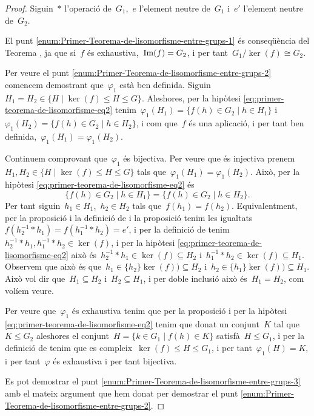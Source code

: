 \documentclass[../../main.tex]{subfiles}
\begin{document}
    \begin{proof}
        Siguin~\(\ast\) l'operació de~\(G_{1}\),~\(e\) l'element neutre de~\(G_{1}\) i~\(e'\) l'element neutre de~\(G_{2}\).

        El punt \eqref{enum:Primer-Teorema-de-lisomorfisme-entre-grups-1} és conseqüència del Teorema , ja que si~\(f\) és exhaustiva,~\(\operatorname{Im}(f)=G_{2}\), i per tant~\(G_{1}/\ker(f)\cong G_{2}\).

        Per veure el punt \eqref{enum:Primer-Teorema-de-lisomorfisme-entre-grups-2} comencem demostrant que~\(\varphi_{1}\) està ben definida.
        Siguin~\(H_{1}=H_{2}\in\{H\mid\ker(f)\leq H\leq G\}\).
        Aleshores, per la hipòtesi \eqref{eq:primer-teorema-de-lisomorfisme-eq2} tenim~\(\varphi_{1}(H_{1})=\{f(h)\in G_{2}\mid h\in H_{1}\}\) i~\(\varphi_{1}(H_{2})=\{f(h)\in G_{2}\mid h\in H_{2}\}\), i com que~\(f\) és una aplicació, i per tant ben definida,~\(\varphi_{1}(H_{1})=\varphi_{1}(H_{2})\).

        Continuem comprovant que~\(\varphi_{1}\) és bijectiva.
        Per veure que és injectiva prenem~\(H_{1},H_{2}\in\{H\mid\ker(f)\leq H\leq G\}\) tals que~\(\varphi_{1}(H_{1})=\varphi_{1}(H_{2})\).
        Això, per la hipòtesi \eqref{eq:primer-teorema-de-lisomorfisme-eq2} és
        \[
            \{f(h)\in G_{2}\mid h\in H_{1}\}=\{f(h)\in G_{2}\mid h\in H_{2}\}.
        \]
        Per tant siguin~\(h_{1}\in H_{1}\),~\(h_{2}\in H_{2}\) tals que~\(f(h_{1})=f(h_{2})\).
        Equivalentment, per la proposició  i la definició de  i la proposició  tenim les igualtats~\(f(h_{2}^{-1}\ast h_{1})=f(h_{1}^{-1}\ast h_{2})=e'\), i per la definició de  tenim~\(h_{2}^{-1}\ast h_{1},h_{1}^{-1}\ast h_{2}\in\ker(f)\), i per la hipòtesi \eqref{eq:primer-teorema-de-lisomorfisme-eq2} això és~\(h_{2}^{-1}\ast h_{1}\in\ker(f)\subseteq H_{2}\) i~\(h_{1}^{-1}\ast h_{2}\in\ker(f)\subseteq H_{1}\).
        Observem que això és que~\(h_{1}\in\{h_{2}\}\ker(f))\subseteq H_{2}\) i~\(h_{2}\in\{h_{1}\}\ker(f))\subseteq H_{1}\).
        Això vol dir que~\(H_{1}\subseteq H_{2}\) i~\(H_{2}\subseteq H_{1}\), i per doble inclusió això és~\(H_{1}=H_{2}\), com volíem veure.

        Per veure que~\(\varphi_{1}\) és exhaustiva tenim que per la proposició  i per la hipòtesi \eqref{eq:primer-teorema-de-lisomorfisme-eq2} tenim que donat un conjunt~\(K\) tal que~\(K\leq G_{2}\) aleshores el conjunt~\(H=\{k\in G_{1}\mid f(h)\in K\}\) satisfà~\(H\leq G_{1}\), i per la definició de  tenim que es compleix~\(\ker(f)\leq H\leq G_{1}\), i per tant~\(\varphi_{1}(H)=K\), i per tant~\(\varphi\) és exhaustiva i per tant bijectiva.

        Es pot demostrar el punt \eqref{enum:Primer-Teorema-de-lisomorfisme-entre-grups-3} amb el mateix argument que hem donat per demostrar el punt \eqref{enum:Primer-Teorema-de-lisomorfisme-entre-grups-2}.
    \end{proof}
\end{document}
